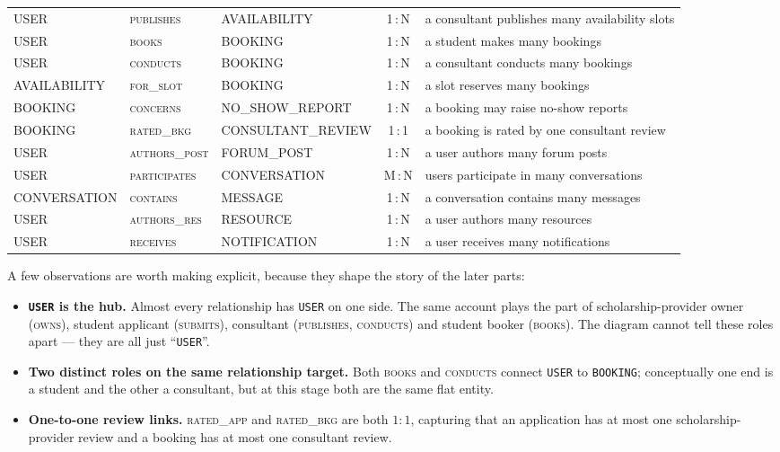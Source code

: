 \documentclass[11pt,a4paper]{article}
\begin{document}
\begin{longtable}{@{}>{\raggedright\arraybackslash}p{3.0cm}>{\raggedright\arraybackslash}p{2.4cm}>{\raggedright\arraybackslash}p{3.0cm}cl@{}}
USER          & \textsc{publishes}     & AVAILABILITY      & 1\,:\,N & a consultant publishes many availability slots \\
USER          & \textsc{books}         & BOOKING           & 1\,:\,N & a student makes many bookings \\
USER          & \textsc{conducts}      & BOOKING           & 1\,:\,N & a consultant conducts many bookings \\
AVAILABILITY  & \textsc{for\_slot}     & BOOKING           & 1\,:\,N & a slot reserves many bookings \\
BOOKING       & \textsc{concerns}      & NO\_SHOW\_REPORT  & 1\,:\,N & a booking may raise no-show reports \\
BOOKING       & \textsc{rated\_bkg}    & CONSULTANT\_REVIEW& 1\,:\,1 & a booking is rated by one consultant review \\
USER          & \textsc{authors\_post} & FORUM\_POST       & 1\,:\,N & a user authors many forum posts \\
USER          & \textsc{participates}  & CONVERSATION      & M\,:\,N & users participate in many conversations \\
CONVERSATION  & \textsc{contains}      & MESSAGE           & 1\,:\,N & a conversation contains many messages \\
USER          & \textsc{authors\_res}  & RESOURCE          & 1\,:\,N & a user authors many resources \\
USER          & \textsc{receives}      & NOTIFICATION      & 1\,:\,N & a user receives many notifications \\
\end{longtable}

A few observations are worth making explicit, because they shape the story of
the later parts:

\begin{itemize}[leftmargin=1.4em]
  \item \textbf{\texttt{USER} is the hub.} Almost every relationship has
        \texttt{USER} on one side. The same account plays the part of
        scholarship-provider owner (\textsc{owns}), student applicant
        (\textsc{submits}), consultant (\textsc{publishes}, \textsc{conducts})
        and student booker (\textsc{books}). The diagram cannot tell these roles
        apart --- they are all just ``\texttt{USER}''.
  \item \textbf{Two distinct roles on the same relationship target.} Both
        \textsc{books} and \textsc{conducts} connect \texttt{USER} to
        \texttt{BOOKING}; conceptually one end is a student and the other a
        consultant, but at this stage both are the same flat entity.
  \item \textbf{One-to-one review links.} \textsc{rated\_app} and
        \textsc{rated\_bkg} are both $1{:}1$, capturing that an application has
        at most one scholarship-provider review and a booking has at most one
        consultant review.
\end{itemize}
\end{document}
